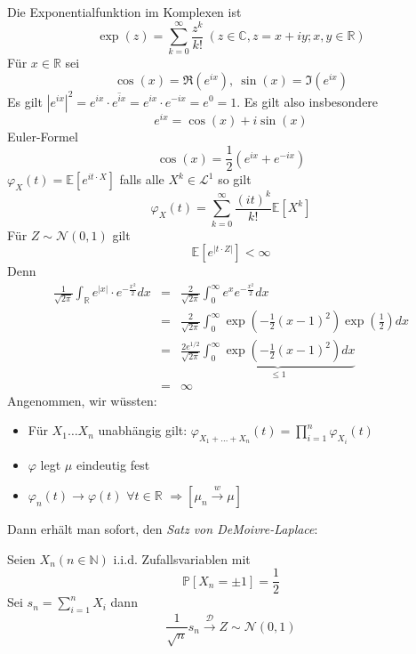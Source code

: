 \documentclass[10pt,a4paper]{report}
\numberwithin{equation}{section}
\numberwithin{figure}{section}
\theoremstyle{plain}
\theoremstyle{definition}
\theoremstyle{remark}
\theoremstyle{plain}
\newcommand{\1}{ \mathbb{1} } %
\begin{document}
Die Exponentialfunktion im Komplexen ist 
\[
\exp\left(z\right)=\sum_{k=0}^{\infty}\frac{z^{k}}{k!}\ \left(z\in\mathbb{C},z=x+iy;x,y\in\mathbb{R}\right)
\]
Für $x\in\mathbb{R}$ sei
\[
\cos\left(x\right)=\Re\left(e^{ix}\right),\ \sin\left(x\right)=\Im\left(e^{ix}\right)
\]
Es gilt $\left|e^{ix}\right|^{2}=e^{ix}\cdot\overline{e^{ix}}=e^{ix}\cdot e^{-ix}=e^{0}=1$.
Es gilt also insbesondere 
\[
e^{ix}=\cos\left(x\right)+i\sin\left(x\right)
\]
Euler-Formel 
\[
\cos\left(x\right)=\frac{1}{2}\left(e^{ix}+e^{-ix}\right)
\]
$\varphi_{X}\left(t\right)=\mathbb{E}\left[e^{it\cdot X}\right]$
falls alle $X^{k}\in\mathcal{L}^{1}$ so gilt 
\[
\varphi_{X}\left(t\right)=\sum_{k=0}^{\infty}\frac{\left(it\right)^{k}}{k!}\mathbb{E}\left[X^{k}\right]
\]
Für $Z\sim\mathcal{N}\left(0,1\right)$ gilt
\[
\mathbb{E}\left[e^{\left|t\cdot Z\right|}\right]<\infty
\]
Denn 
\begin{eqnarray*}
  \frac{1}{\sqrt{2\pi}}\int_{\mathbb{R}}e^{\left|x\right|}\cdot e^{-\frac{x^{2}}{2}}dx & = & \frac{2}{\sqrt{2\pi}}\int_{0}^{\infty}e^{x}e^{-\frac{x^{2}}{2}}dx\\
  & = & \frac{2}{\sqrt{2\pi}}\int_{0}^{\infty}\exp\left(-\frac{1}{2}\left(x-1\right)^{2}\right)\exp\left(\frac{1}{2}\right)dx\\
  & = & \frac{2e^{1/2}}{\sqrt{2\pi}}\underset{\leq1}{\underbrace{\int_{0}^{\infty}\exp\left(-\frac{1}{2}\left(x-1\right)^{2}\right)dx}}\\
  & = & \infty
\end{eqnarray*}
Angenommen, wir wüssten:
\begin{itemize}
\item Für $X_{1}\ldots X_{n}$ unabhängig gilt: $\varphi_{X_{1}+\ldots+X_{n}}\left(t\right)=\prod_{i=1}^{n}\varphi_{X_{i}}\left(t\right)$
\item $\varphi$ legt $\mu$ eindeutig fest
\item $\varphi_{n}\left(t\right)\to\varphi\left(t\right)$ $\forall t\in\mathbb{R}$
  $\Rightarrow\left[\mu_{n}\overset{w}{\longrightarrow}\mu\right]$
\end{itemize}
Dann erhält man sofort, den \emph{Satz von DeMoivre-Laplace}:

Seien $X_{n}\left(n\in\mathbb{N}\right)$ i.i.d. Zufallsvariablen mit 
\[
\mathbb{P}\left[X_{n}=\pm1\right]=\frac{1}{2}
\]
Sei $s_{n}=\sum_{i=1}^{n}X_{i}$ dann 
\[
\frac{1}{\sqrt{n}}s_{n}\overset{\mathcal{D}}{\longrightarrow}Z\sim\mathcal{N}\left(0,1\right)
\]

\end{document}

